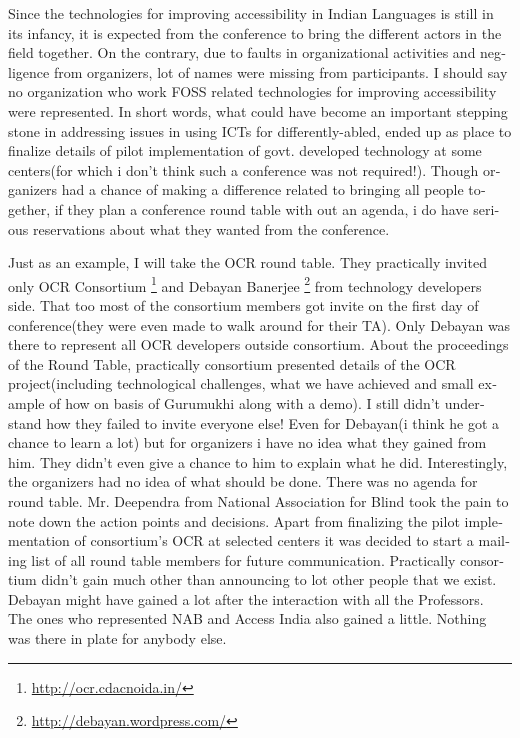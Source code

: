 \begin{english}
Since the technologies for improving accessibility in Indian Languages is still in its infancy, it is expected from the conference to bring the different actors in the field together. On the contrary, due to faults in organizational activities and negligence from organizers, lot of names were missing from participants. I should say no organization who work FOSS related technologies for improving accessibility were represented. In short words, what could have become an important stepping stone in addressing issues in using ICTs for differently-abled, ended up as place to finalize details of pilot implementation of govt. developed technology at some centers(for which i don’t think such a conference was not required!). Though organizers had a chance of making a difference related to bringing all people together, if they plan a conference round table with out an agenda, i do have serious reservations about what they wanted from the conference.

Just as an example, I will take the OCR round table. They practically invited only OCR Consortium \footnote{\url{http://ocr.cdacnoida.in/}} and Debayan Banerjee \footnote{\url{http://debayan.wordpress.com/}} from technology developers side. That too most of the consortium members got invite on the first day of conference(they were even made to walk around for their TA). Only Debayan was there to represent all OCR developers outside consortium. About the proceedings of the Round Table, practically consortium presented details of the OCR project(including technological challenges, what we have achieved and small example of how on basis of Gurumukhi along with a demo). I still didn’t understand how they failed to invite everyone else! Even for Debayan(i think he got a chance to learn a lot) but for organizers i have no idea what they gained from him. They didn’t even give a chance to him to explain what he did. Interestingly, the organizers had no idea of what should be done. There was no agenda for round table. Mr. Deependra from National Association for Blind took the pain to note down the action points and decisions. Apart from finalizing the pilot implementation of consortium’s OCR at selected centers it was decided to start a mailing list of all round table members for future communication. Practically consortium didn’t gain much other than announcing to lot other people that we exist. Debayan might have gained a lot after the interaction with all the Professors. The ones who represented NAB and Access India also gained a little. Nothing was there in plate for anybody else.


\end{english}
